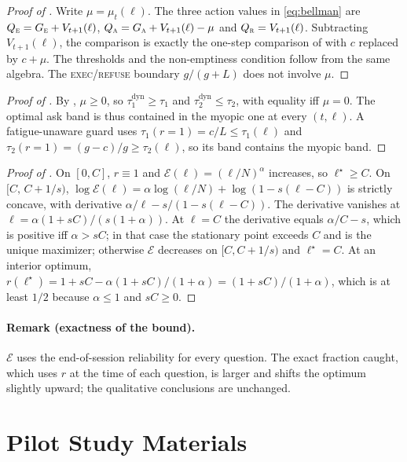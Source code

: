 \documentclass[10pt]{article}
\newcommand{\EXEC}{\textup{\textsc{exec}}\xspace}
\newcommand{\REFUSE}{\textup{\textsc{refuse}}\xspace}
\newcommand{\dyn}{\mathrm{dyn}}
\theoremstyle{plain}
\theoremstyle{definition}
\begin{document}
\begin{proof}[Proof of ]
Write $\mu=\mu_t(\ell)$. The three action values in \eqref{eq:bellman} are $Q_{\textsc{e}}=G_{\textsc{e}}+V_{t+1}(\ell)$, $Q_{\textsc{a}}=G_{\textsc{a}}+V_{t+1}(\ell)-\mu$ and $Q_{\textsc{r}}=V_{t+1}(\ell)$. Subtracting $V_{t+1}(\ell)$, the comparison is exactly the one-step comparison of  with $c$ replaced by $c+\mu$. The thresholds and the non-emptiness condition follow from the same algebra. The \EXEC/\REFUSE boundary $g/(g+L)$ does not involve $\mu$.
\end{proof}

\begin{proof}[Proof of ]
By , $\mu\ge0$, so $\tau_1^{\dyn}\ge\tau_1$ and $\tau_2^{\dyn}\le\tau_2$, with equality iff $\mu=0$. The optimal ask band is thus contained in the myopic one at every $(t,\ell)$. A fatigue-unaware guard uses $\tau_1(r{=}1)=c/L\le\tau_1(\ell)$ and $\tau_2(r{=}1)=(g-c)/g\ge\tau_2(\ell)$, so its band contains the myopic band.
\end{proof}

\begin{proof}[Proof of ]
On $[0,C]$, $r\equiv1$ and $\mathcal{E}(\ell)=(\ell/N)^\alpha$ increases, so $\ell^\star\ge C$. On $[C,\,C+1/s)$, $\log\mathcal E(\ell)=\alpha\log(\ell/N)+\log(1-s(\ell-C))$ is strictly concave, with derivative $\alpha/\ell-s/(1-s(\ell-C))$. The derivative vanishes at $\ell=\alpha(1+sC)/(s(1+\alpha))$. At $\ell=C$ the derivative equals $\alpha/C-s$, which is positive iff $\alpha>sC$; in that case the stationary point exceeds $C$ and is the unique maximizer; otherwise $\mathcal E$ decreases on $[C,C+1/s)$ and $\ell^\star=C$. At an interior optimum, $r(\ell^\star)=1+sC-\alpha(1+sC)/(1+\alpha)=(1+sC)/(1+\alpha)$, which is at least $1/2$ because $\alpha\le1$ and $sC\ge0$.
\end{proof}

\paragraph{Remark (exactness of the bound).} $\mathcal E$ uses the end-of-session reliability for every question. The exact fraction caught, which uses $r$ at the time of each question, is larger and shifts the optimum slightly upward; the qualitative conclusions are unchanged.

\section{Pilot Study Materials}\label{app:pilot}
\end{document}
